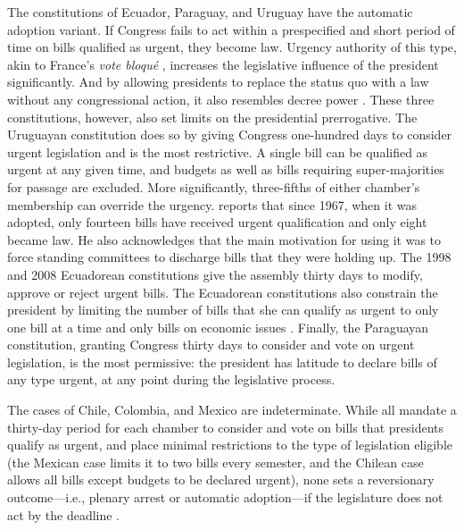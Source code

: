 \documentclass[letter,12pt]{article}
\begin{document}
The constitutions of Ecuador, Paraguay, and Uruguay have the automatic adoption variant. If Congress fails to act within a prespecified and short period of time on bills qualified as urgent, they become law. Urgency authority of this type, akin to France's \emph{vote bloqué} \citep{huber.1996b}, increases the legislative influence of the president significantly. And by allowing presidents to replace the status quo with a law without any congressional action, it also resembles decree power \citep{carey.shugart.1998}. These three constitutions, however, also set limits on the presidential prerrogative. The Uruguayan constitution does so by giving Congress one-hundred days to consider urgent legislation and is the most restrictive. A single bill can be qualified as urgent at any given time, and budgets as well as bills requiring super-majorities for passage are excluded. More significantly, three-fifths of either chamber’s membership can override the urgency. \citet{chasquetti.2016} reports that since 1967, when it was adopted, only fourteen bills have received urgent qualification and only eight became law. He also acknowledges that the main motivation for using it was to force standing committees to discharge bills that they were holding up. The 1998 and 2008 Ecuadorean constitutions give the assembly thirty days to modify, approve or reject urgent bills. The Ecuadorean constitutions also constrain the president by limiting the number of bills that she can qualify as urgent to only one bill at a time and only bills on economic issues \citep{morgenstern-polga-shair.2013}. Finally, the Paraguayan constitution, granting Congress thirty days to consider and vote on urgent legislation, is the most permissive: the president has latitude to declare bills of any type urgent, at any point during the legislative process.

The cases of Chile, Colombia, and Mexico are indeterminate. While all mandate a thirty-day period for each chamber to consider and vote on bills that presidents qualify as urgent, and place minimal restrictions to the type of legislation eligible (the Mexican case limits it to two bills every semester, and the Chilean case allows all bills except budgets to be declared urgent), none sets a reversionary outcome—i.e., plenary arrest or automatic adoption—if the legislature does not act by the deadline \citep{nolte.2003,sotoCongChile2015,carroll-pachon.2016,magar.2014-refConst}.
\end{document}
